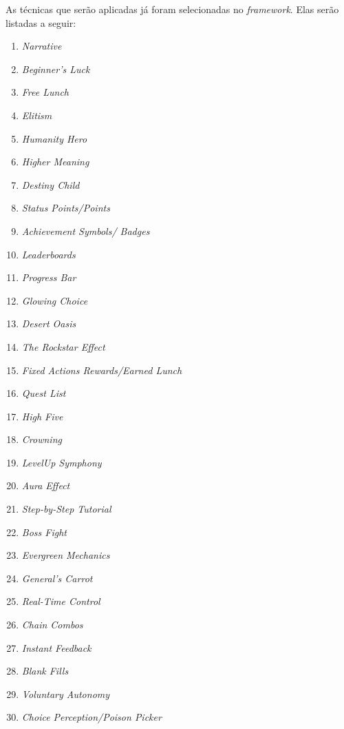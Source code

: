 As técnicas que serão aplicadas já foram selecionadas no \textit{framework}. Elas serão listadas a seguir:

\begin{multicols}{2}
    \begin{enumerate}
        \item \textit{Narrative}
        \item \textit{Beginner's Luck}
        \item \textit{Free Lunch}
        \item \textit{Elitism}
        \item \textit{Humanity Hero}
        \item \textit{Higher Meaning}
        \item \textit{Destiny Child}
        \item \textit{Status Points/Points}
        \item \textit{Achievement Symbols/ Badges}
        \item \textit{Leaderboards}
        \item \textit{Progress Bar}
        \item \textit{Glowing Choice}
        \item \textit{Desert Oasis}
        \item \textit{The Rockstar Effect}
        \item \textit{Fixed Actions Rewards/Earned Lunch}
        \item \textit{Quest List}
        \item \textit{High Five}
        \item \textit{Crowning}
        \item \textit{LevelUp Symphony}
        \item \textit{Aura Effect}
        \item \textit{Step-by-Step Tutorial}
        \item \textit{Boss Fight}
        \item \textit{Evergreen Mechanics}
        \item \textit{General's Carrot}
        \item \textit{Real-Time Control}
        \item \textit{Chain Combos}
        \item \textit{Instant Feedback}
        \item \textit{Blank Fills}
        \item \textit{Voluntary Autonomy}
        \item \textit{Choice Perception/Poison Picker}

\end{enumerate}
\end{multicols}
